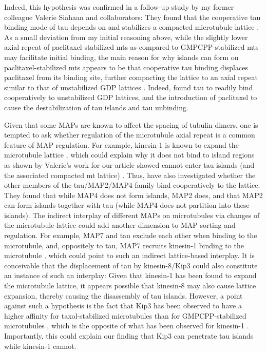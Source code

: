 Indeed, this hypothesis was confirmed in a follow-up study by my former colleague Valerie Siahaan and collaborators: They found that the cooperative tau binding mode of tau depends on and stabilizes a compacted microtubule lattice \parencite{siahaan2022microtubule}. As a small deviation from my initial reasoning above, while the slightly lower axial repeat of paclitaxel-stabilized mts as compared to GMPCPP-stabilized mts may facilitate initial binding, the main reason for why islands can form on paclitaxel-stabilized mts appears to be that cooperative tau binding displaces paclitaxel from its binding site, further compacting the lattice to an axial repeat similar to that of unstabilized GDP lattices \parencite{siahaan2022microtubule}. Indeed, \cite{siahaan2022microtubule} found tau to readily bind cooperatively to unstabilized GDP lattices, and the introduction of paclitaxel to cause the destabilization of tau islands and tau unbinding.\par

Given that some MAPs are known to affect the spacing of tubulin dimers, one is tempted to ask whether regulation of the microtubule axial repeat is a common feature of MAP regulation. For example, kinesin-1 is known to expand the microtubule lattice , which could explain why it does not bind to island regions as shown by Valerie's work for our article showed cannot enter tau islands (and the associated compacted mt lattice) . Thus, \cite{siahaan2022microtubule} have also investigated whether the other members of the tau/MAP2/MAP4 family bind cooperatively to the lattice. They found that while MAP4 does not form islands, MAP2 does, and that MAP2 can form islands together with tau (while MAP4 does not partition into these islands). The indirect interplay of different MAPs on microtubules via changes of the microtubule lattice could add another dimension to MAP sorting and regulation. For example, MAP7 and tau exclude each other when binding to the microtubule, and, oppositely to tau, MAP7 recruits kinesin-1 binding to the microtubule \cite{Monroy2018}, which could point to such an indirect lattice-based interplay. It is conceivable that the displacement of tau by kinesin-8/Kip3 could also constitute an instance of such an interplay: Given that kinesin-1 has been found to expand the microtubule lattice, it appears possible that kinesin-8 may also cause lattice expansion, thereby causing the disassembly of tau islands. However, a point against such a hypothesis is the fact that Kip3 has been observed to have a higher affinity for taxol-stabilized microtubules than for GMPCPP-stabilized microtubules , which is the opposite of what has been observed for kinesin-1 . Importantly, this could explain our finding that Kip3 can penetrate tau islands while kinesin-1 cannot.\par

